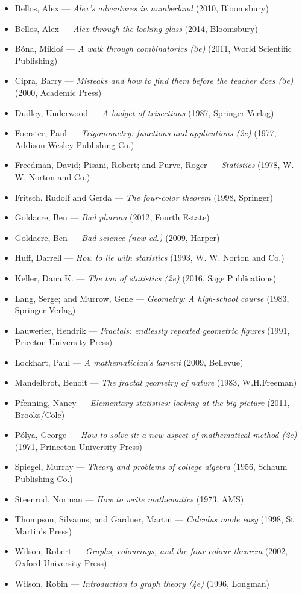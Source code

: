 \begin{itemize}[noitemsep]
  \item Bellos, Alex --- \emph{Alex's adventures in numberland} (2010, Bloomsbury)
  \item Bellos, Alex --- \emph{Alex through the looking-glass} (2014, Bloomsbury)
  \item B\'ona, Miklo\'s --- \emph{A walk through combinatorics (3e)} (2011, World Scientific Publishing)
  \item Cipra, Barry --- \emph{Misteaks and how to find them before the teacher does (3e)} (2000, Academic Press)
  \item Dudley, Underwood --- \emph{A budget of trisections} (1987, Springer-Verlag)
  \item Foerster, Paul --- \emph{Trigonometry: functions and applications (2e)} (1977, Addison-Wesley Publishing Co.)
  \item Freedman, David; Pisani, Robert; and Purve, Roger --- \emph{Statistics} (1978, W. W. Norton and Co.)
  \item Fritsch, Rudolf and Gerda --- \emph{The four-color theorem} (1998, Springer)
  \item Goldacre, Ben --- \emph{Bad pharma} (2012, Fourth Estate)
  \item Goldacre, Ben --- \emph{Bad science (new ed.)} (2009, Harper)
  \item Huff, Darrell --- \emph{How to lie with statistics} (1993, W. W. Norton and Co.)
  \item Keller, Dana K. --- \emph{The tao of statistics (2e)} (2016, Sage Publications)
  \item Lang, Serge; and Murrow, Gene --- \emph{Geometry: A high-school course} (1983, Springer-Verlag)
  \item Lauwerier, Hendrik --- \emph{Fractals: endlessly repeated geometric figures} (1991, Priceton University Press)
  \item Lockhart, Paul --- \emph{A mathematician's lament} (2009, Bellevue)
  \item Mandelbrot, Benoit --- \emph{The fractal geometry of nature} (1983, W.H.Freeman)
  \item Pfenning, Nancy --- \emph{Elementary statistics: looking at the big picture} (2011, Brooks/Cole)
  \item P\'olya, George --- \emph{How to solve it: a new aspect of mathematical method (2e)} (1971, Princeton University Press)
  \item Spiegel, Murray --- \emph{Theory and problems of college algebra} (1956, Schaum Publishing Co.)
  \item Steenrod, Norman --- \emph{How to write mathematics} (1973, AMS)
  \item Thompson, Silvanus; and Gardner, Martin --- \emph{Calculus made easy} (1998, St Martin's Press)
  \item Wilson, Robert --- \emph{Graphs, colourings, and the four-colour theorem} (2002, Oxford University Press)
  \item Wilson, Robin --- \emph{Introduction to graph theory (4e)} (1996, Longman)
\end{itemize}


